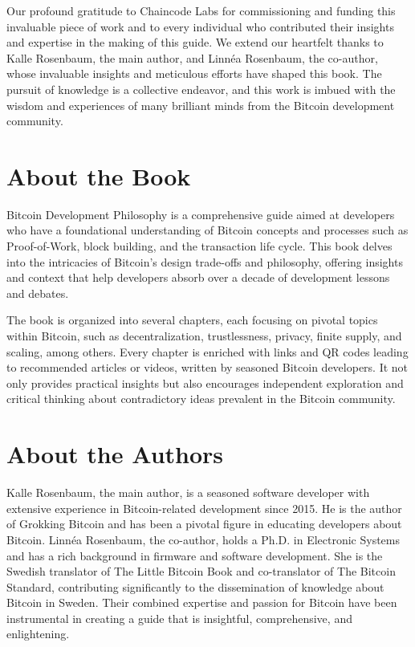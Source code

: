 Our profound gratitude to Chaincode Labs for commissioning and funding
this invaluable piece of work and to every individual who contributed
their insights and expertise in the making of this guide. We extend our
heartfelt thanks to Kalle Rosenbaum, the main author, and Linnéa
Rosenbaum, the co-author, whose invaluable insights and meticulous
efforts have shaped this book. The pursuit of knowledge is a collective
endeavor, and this work is imbued with the wisdom and experiences of
many brilliant minds from the Bitcoin development community.

\hypertarget{about-the-book}{%
\section{About the Book}\label{about-the-book}}

Bitcoin Development Philosophy is a comprehensive guide aimed at
developers who have a foundational understanding of Bitcoin concepts and
processes such as Proof-of-Work, block building, and the transaction
life cycle. This book delves into the intricacies of Bitcoin's design
trade-offs and philosophy, offering insights and context that help
developers absorb over a decade of development lessons and debates.

The book is organized into several chapters, each focusing on pivotal
topics within Bitcoin, such as decentralization, trustlessness, privacy,
finite supply, and scaling, among others. Every chapter is enriched with
links and QR codes leading to recommended articles or videos, written by
seasoned Bitcoin developers. It not only provides practical insights but
also encourages independent exploration and critical thinking about
contradictory ideas prevalent in the Bitcoin community.

\hypertarget{about-the-authors}{%
\section{About the Authors}\label{about-the-authors}}

Kalle Rosenbaum, the main author, is a seasoned software developer with
extensive experience in Bitcoin-related development since 2015. He is
the author of Grokking Bitcoin and has been a pivotal figure in
educating developers about Bitcoin. Linnéa Rosenbaum, the co-author,
holds a Ph.D. in Electronic Systems and has a rich background in
firmware and software development. She is the Swedish translator of The
Little Bitcoin Book and co-translator of The Bitcoin Standard,
contributing significantly to the dissemination of knowledge about
Bitcoin in Sweden. Their combined expertise and passion for Bitcoin have
been instrumental in creating a guide that is insightful, comprehensive,
and enlightening.

